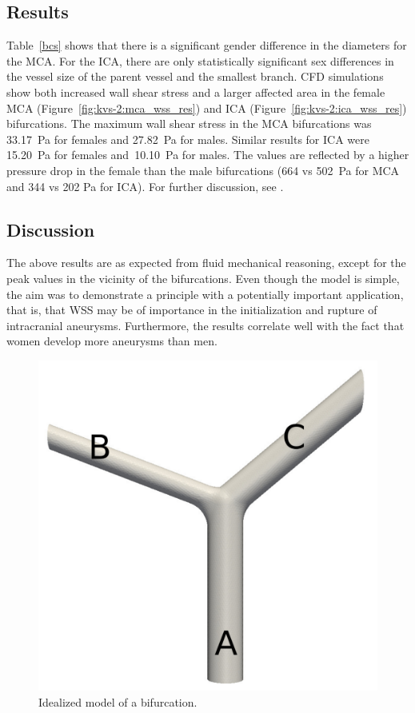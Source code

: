 \subsection{Results}

Table~\ref{bcs} shows that there is a significant gender difference in
the diameters for the MCA. For the ICA, there are only statistically
significant sex differences in the vessel size of the parent vessel
and the smallest branch. CFD simulations show both increased wall
shear stress and a larger affected area in the female MCA
(Figure~\ref{fig:kvs-2:mca_wss_res}) and ICA
(Figure~\ref{fig:kvs-2:ica_wss_res}) bifurcations. The maximum wall
shear stress in the MCA bifurcations was 33.17~Pa for females and
27.82~Pa for males. Similar results for ICA were 15.20~Pa for females
and~10.10~Pa for males. The values are reflected by a higher pressure
drop in the female than the male bifurcations (664 vs 502~Pa for MCA
and 344 vs 202 Pa for ICA). For further discussion,
see \citet{LindekleivValen-SendstadMorganEtAl2010}.

\subsection{Discussion}

The above results are as expected from fluid mechanical reasoning,
except for the peak values in the vicinity of the bifurcations. Even
though the model is simple, the aim was to demonstrate a principle
with a potentially important application, that is, that WSS may be of
importance in the initialization and rupture of intracranial
aneurysms. Furthermore, the results correlate well with the fact that
women develop more aneurysms than men.

\begin{figure}
  \center\includegraphics[width=\largefig]{chapters/kvs-2/pdf/bifurcation_clean.pdf}
  \caption{Idealized model of a bifurcation.}
\end{figure}

